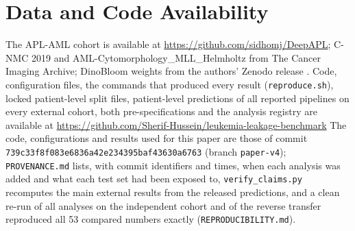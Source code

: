 \documentclass[journal]{IEEEtran}
\begin{document}
\section*{Data and Code Availability}
The APL-AML cohort is available at \url{https://github.com/sidhomj/DeepAPL}; C-NMC 2019 \cite{mourya2019cnmcdata} and AML-Cytomorphology\_MLL\_Helmholtz \cite{hehr2023scemila} from The Cancer Imaging Archive; DinoBloom weights from the authors' Zenodo release \cite{koch2024dinobloom}. Code, configuration files, the commands that produced every result (\texttt{reproduce.sh}), locked patient-level split files, patient-level predictions of all reported pipelines on every external cohort, both pre-specifications and the analysis registry are available at \url{https://github.com/Sherif-Hussein/leukemia-leakage-benchmark} The code, configurations and results used for this paper are those of commit \texttt{739c33f8f083e6836a42e234395baf43630a6763} (branch \texttt{paper-v4}); \texttt{PROVENANCE.md} lists, with commit identifiers and times, when each analysis was added and what each test set had been exposed to, \texttt{verify\_claims.py} recomputes the main external results from the released predictions, and a clean re-run of all analyses on the independent cohort and of the reverse transfer reproduced all 53 compared numbers exactly (\texttt{REPRODUCIBILITY.md}).



\end{document}
